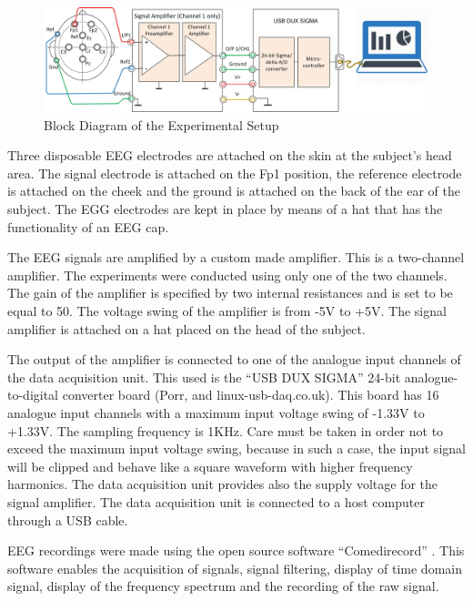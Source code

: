 \begin{figure}[hbt!]
	\centering
	\includegraphics[width=\linewidth]{Figures/HardwareSetup.jpg} 
	\caption{Block Diagram of the Experimental Setup} 
	\label{Hsetup} 
\end{figure}

Three disposable EEG electrodes are attached on the skin at the subject’s head area. The signal electrode is attached on the Fp1 position, the reference electrode is attached on the cheek and the ground is attached on the back of the ear of the subject. The EGG electrodes are kept in place by means of a hat that has the functionality of an EEG cap. 

The EEG signals are amplified by a custom made amplifier. This is a two-channel amplifier. The experiments were conducted using only one of the two channels. The gain of the amplifier is specified by two internal resistances and is set to be equal to 50. The voltage swing of the amplifier is from -5V to +5V. The signal amplifier is attached on a hat placed on the head of the subject. 

The output of the amplifier is connected to one of the analogue input channels of the data acquisition unit. This used is the “USB DUX SIGMA” 24-bit analogue-to-digital converter board (Porr, and linux-usb-daq.co.uk). This board has 16 analogue input channels with a maximum input voltage swing of -1.33V to +1.33V. The sampling frequency is 1KHz. Care must be taken in order not to exceed the maximum input voltage swing, because in such a case, the input signal will be clipped and behave like a square waveform with higher frequency harmonics.  The data acquisition unit provides also the supply voltage for the signal amplifier. The data acquisition unit is connected to a host computer through a USB cable. 

EEG recordings were made using the open source software “Comedirecord” \citep{Porr}. This software enables the acquisition of signals, signal filtering, display of time domain signal, display of the frequency spectrum and the recording of the raw signal.

